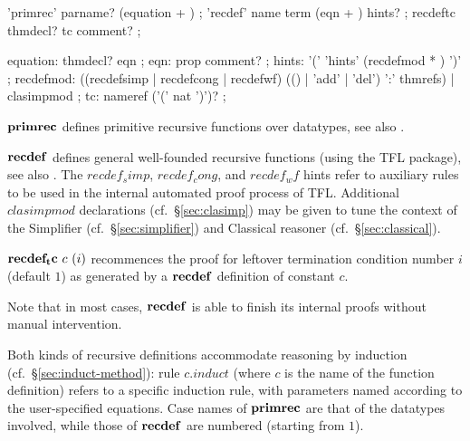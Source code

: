 



\begin{rail}
  'primrec' parname? (equation + )
  ;
  'recdef' name term (eqn + ) hints?
  ;
  recdeftc thmdecl? tc comment?
  ;

  equation: thmdecl? eqn
  ;
  eqn: prop comment?
  ;
  hints: '(' 'hints' (recdefmod * ) ')'
  ;
  recdefmod: ((recdefsimp | recdefcong | recdefwf) (() | 'add' | 'del') ':' thmrefs) | clasimpmod
  ;
  tc: nameref ('(' nat ')')?
  ;
\end{rail}

\begin{descr}
\item [${\mathord{\mathbf{primrec}}}$] defines primitive recursive functions over
  datatypes, see also \cite{isabelle-HOL}.
\item [${\mathord{\mathbf{recdef}}}$] defines general well-founded recursive
  functions (using the TFL package), see also \cite{isabelle-HOL}.  The
  $recdef_simp$, $recdef_cong$, and $recdef_wf$ hints refer to auxiliary rules
  to be used in the internal automated proof process of TFL.  Additional
  $clasimpmod$ declarations (cf.\ \S\ref{sec:clasimp}) may be given to tune
  the context of the Simplifier (cf.\ \S\ref{sec:simplifier}) and Classical
  reasoner (cf.\ \S\ref{sec:classical}).
\item [${\mathord{\mathbf{recdef_tc}}}~c~(i)$] recommences the proof for leftover
  termination condition number $i$ (default $1$) as generated by a
  ${\mathord{\mathbf{recdef}}}$ definition of constant $c$.
  
  Note that in most cases, ${\mathord{\mathbf{recdef}}}$ is able to finish its
  internal proofs without manual intervention.
\end{descr}

Both kinds of recursive definitions accommodate reasoning by induction (cf.\ 
\S\ref{sec:induct-method}): rule $c\mathord{.}induct$ (where $c$ is the name
of the function definition) refers to a specific induction rule, with
parameters named according to the user-specified equations.  Case names of
${\mathord{\mathbf{primrec}}}$ are that of the datatypes involved, while those of
${\mathord{\mathbf{recdef}}}$ are numbered (starting from $1$).

